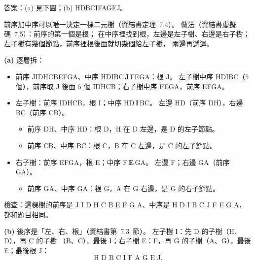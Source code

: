 \begin{pastsoln}
答案：(a) 見下圖；(b) HDBCIFAGEJ。

前序加中序可以唯一決定一棵二元樹（資結書定理~7.4）。 做法（資結書虛擬碼~7.5）：前序的第一個是根；
在中序裡找到根，左邊是左子樹、右邊是右子樹；左子樹有幾個節點，前序裡根後面就切幾個給左子樹，
兩邊再遞迴。

\textbf{(a)} 逐層拆：
\begin{itemize}
\item 前序 JIDHCBEFGA、中序 HDIBC\,\textbf{J}\,FEGA：根 J。 左子樹中序 HDIBC（$5$ 個），前序取 J 後面
$5$ 個 IDHCB；右子樹中序 FEGA，前序 EFGA。
\item 左子樹：前序 IDHCB，根 I；中序 HD\,\textbf{I}\,BC。 左邊 HD（前序 DH），右邊 BC（前序 CB）。
\begin{itemize}
\item 前序 DH、中序 HD：根 D，H 在 D 左邊，是 D 的左子節點。
\item 前序 CB、中序 BC：根 C，B 在 C 左邊，是 C 的左子節點。
\end{itemize}
\item 右子樹：前序 EFGA，根 E；中序 F\,\textbf{E}\,GA。 左邊 F；右邊 GA（前序 GA）。
\begin{itemize}
\item 前序 GA、中序 GA：根 G，A 在 G 右邊，是 G 的右子節點。
\end{itemize}
\end{itemize}
\begin{center}
\end{center}
檢查：這棵樹的前序是 J I D H C B E F G A、中序是 H D I B C J F E G A，都和題目相同。

\textbf{(b)} 後序是「左、右、根」（資結書第~7.3~節）。 左子樹 I：先 D 的子樹（H、D），再 C 的子樹
（B、C），最後 I；右子樹 E：F，再 G 的子樹（A、G），最後 E；最後根 J：
\[
\text{H D B C I F A G E J}.
\]
\end{pastsoln}
